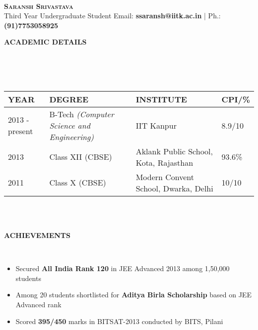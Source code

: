 \documentclass[a4paper,10pt]{article}
\newcommand{\isep}{-2 pt}
\newcommand{\lsep}{-0.5cm}
\newcommand{\resheading}[1]{{\small \colorbox{mygrey}{\begin{minipage}{0.975\textwidth}{\textbf{#1 \vphantom{p\^{E}}}}\end{minipage}}}}
\begin{document}
\hspace{0.5cm}\\[-0.2cm]

\textbf{\Huge \textsc{Saransh Srivastava}}\\
\indent Third Year Undergraduate Student\hfill
Email: \textbf{ssaransh@iitk.ac.in} |
Ph.: \textbf{(91)7753058925} \\

\resheading{\textbf{ACADEMIC DETAILS} }\\[\lsep]
\\ \\
\indent \begin{tabular}{ L{3cm} L{7cm} L{8cm} L{1.2cm} }
\hline
\textbf{YEAR} & \textbf{DEGREE} & \textbf{INSTITUTE}  & \textbf{CPI/\%} \\
\hline

2013 - present & B-Tech \emph{(Computer Science and Engineering)} & IIT Kanpur & 8.9/10 \\
2013 & Class XII (CBSE) & Aklank Public School, Kota, Rajasthan  & 93.6\% \\
2011 & Class X (CBSE) & Modern Convent School, Dwarka, Delhi & 10/10 \\
\hline
\end{tabular}
\\ \\


\resheading{\textbf{ACHIEVEMENTS} }\\[\lsep]
\begin{itemize}\itemsep \isep
\item \noindent Secured \textbf{All India Rank 120} in JEE Advanced 2013 among 1,50,000 students
\item \noindent Among 20 students shortlisted for \textbf{Aditya Birla Scholarship} based on JEE Advanced rank
\item \noindent Scored \textbf{395/450} marks in BITSAT-2013 conducted by BITS, Pilani
\end{itemize}
\end{document}
